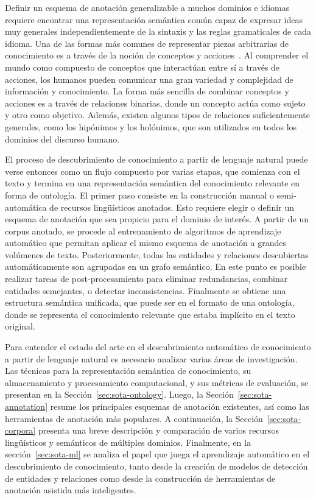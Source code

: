 Definir un esquema de anotación generalizable a muchos dominios e idiomas requiere encontrar una representación semántica común capaz de expresar ideas muy generales independientemente de la sintaxis y las reglas gramaticales de cada idioma.
Una de las formas más comunes de representar piezas arbitrarias de conocimiento es a través de la noción de conceptos y acciones~\cite{teleologies}.
Al comprender el mundo como compuesto de conceptos que interactúan entre sí a través de acciones, los humanos pueden comunicar una gran variedad y complejidad de información y conocimiento.
La forma más sencilla de combinar conceptos y acciones es a través de relaciones binarias, donde un concepto actúa como sujeto y otro como objetivo.
Además, existen algunos tipos de relaciones suficientemente generales, como los hipónimos y los holónimos, que son utilizados en todos los dominios del discurso humano.

El proceso de descubrimiento de conocimiento a partir de lenguaje natural puede verse entonces como un flujo compuesto por varias etapas, que comienza con el texto y termina en una representación semántica del conocimiento relevante en forma de ontología.
El primer paso consiste en la construcción manual o semi-automática de recursos lingüísticos anotados.
Esto requiere elegir o definir un esquema de anotación que sea propicio para el dominio de interés.
A partir de un corpus anotado, se procede al entrenamiento de algoritmos de aprendizaje automático que permitan aplicar el mismo esquema de anotación a grandes volúmenes de texto.
Posteriormente, todas las entidades y relaciones descubiertas automáticamente son agrupadas en un grafo semántico.
En este punto es posible realizar tareas de post-procesamiento para eliminar redundancias, combinar entidades semejantes, o detectar inconsistencias.
Finalmente se obtiene una estructura semántica unificada, que puede ser en el formato de una ontología, donde se representa el conocimiento relevante que estaba implícito en el texto original.

Para entender el estado del arte en el descubrimiento automático de conocimiento a partir de lenguaje natural es necesario analizar varias áreas de investigación.
Las técnicas para la representación semántica de conocimiento, su almacenamiento y procesamiento computacional, y sus métricas de evaluación, se presentan en la Sección~\ref{sec:sota-ontology}.
Luego, la Sección~\ref{sec:sota-annotation} resume los principales esquemas de anotación existentes, así como las herramientas de anotación más populares.
A continuación, la Sección~\ref{sec:sota-corpora} presenta una breve descripción y comparación de varios recursos lingüísticos y semánticos de múltiples dominios.
Finalmente, en la sección~\ref{sec:sota-ml} se analiza el papel que juega el aprendizaje automático en el descubrimiento de conocimiento, tanto desde la creación de modelos de detección de entidades y relaciones como desde la construcción de herramientas de anotación asistida más inteligentes.

